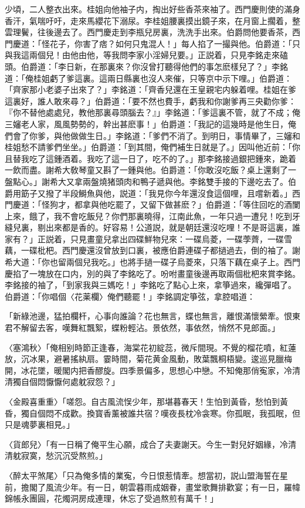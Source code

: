少頃，二人整衣出來。桂姐向他袖子内，掏出好些香茶來袖了。西門慶則使的滿身香汗，氣喘吁吁，走來馬纓花下溺尿。李桂姐腰裏摸出鏡子來，在月窗上擱着，整雲理鬢，往後邊去了。西門慶走到李瓶兒房裏，洗洗手出來。伯爵問他要香茶，西門慶道：「怪花子，你害了痞？如何只鬼混人！」每人掐了一撮與他。伯爵道：「只與我這兩個兒！由他由他，等我問李家小淫婦兒要。」正説着，只見李銘走來磕頭。伯爵道：「李日新，在那裏來？你沒曾打聽得他們的事怎麽樣兒了？」李銘道：「俺桂姐虧了爹這裏。這兩日縣裏也沒人來催，只等京中示下哩。」伯爵道：「齊家那小老婆子出來了？」李銘道：「齊香兒還在王皇親宅内躲着哩。桂姐在爹這裏好，誰人敢來尋？」伯爵道：「要不然也費手，虧我和你謝爹再三央勸你爹：『你不替他處處兒，教他那裏尋頭腦去？』」李銘道：「爹這裏不管，就了不成；俺三嬸老人家，風風勢勢的，幹出甚麽事！」伯爵道：「我記的這幾時是他生日，俺們會了你爹，與他做做生日。」李銘道：「爹們不消了。到明日，事情畢了，三嬸和桂姐愁不請爹們坐坐。」伯爵道：「到其間，俺們補生日就是了。」因叫他近前：「你且替我吃了這鍾酒着。我吃了這一日了，吃不的了。」那李銘接過銀把鍾來，跪着一飲而盡。謝希大敎琴童又斟了一鍾與他。伯爵道：「你敢沒吃飯？桌上還剩了一盤點心。」謝希大又拿兩盤燒猪頭肉和鴨子遞與他。李銘雙手接的下邊吃去了。伯爵用筯子又撥了半段鰣魚與他，説道：「我見你今年還沒食這個哩，且嚐新着。」西門慶道：「怪狗才，都拿與他吃罷了，又留下做甚麽？」伯爵道：「等住回吃的酒闌上來，餓了，我不會吃飯兒？你們那裏曉得，江南此魚，一年只過一遭兒！吃到牙縫兒裏，剔出來都是香的。好容易！公道説，就是朝廷還沒吃哩！不是哥這裏，誰家有？」正説着，只見畫童兒拿出四碟鮮物兒來：一碟烏菱，一碟荸薺，一碟雪藕，一碟枇杷。西門慶還沒曾放到口裏，被應伯爵連碟子都撾過去，倒的袖了。謝希大道：「你也留兩個兒我吃。」也將手撾一碟子烏菱來，只落下藕在桌子上。西門慶掐了一塊放在口内，別的與了李銘吃了。吩咐畫童後邊再取兩個枇杷來賞李銘。李銘接的袖了，「到家我與三媽吃！」李銘吃了點心上來，拿箏過來，纔彈唱了。伯爵道：「你唱個〈花薬欄〉俺們聽罷！」李銘調定箏弦，拿腔唱道：

\begin{myquote}
「新綠池邊，猛拍欄杆，心事向誰論？花也無言，蝶也無言，離恨滿懷縈牽。恨東君不解留去客，嘆舞紅飄絮，蝶粉輕沾。景依然，事依然，悄然不見郎面。」

{\markfont〈塞鴻秋〉}「俺相别時節正逢春，海棠花初綻蕊，微斥間現。不覺的榴花噴，紅蓮放，沉冰果，避暑搖紈扇。霎時間，菊花黄金風動，敗葉飄桐梧變。逡巡見臘梅開，冰花墜，暖閣内把香醪旋。四季景偏多，思想心中戀。不知俺那俏寃家，冷清清獨自個悶懨懨何處躭寂怨？」

{\markfont〈金殿喜重重〉}「嗟怨。自古風流悮少年，那堪暮春天！生怕到黃昏，愁怕到黃昏，獨自個悶不成歡。換寳香薰被誰共宿？嘆夜長枕冷衾寒。你孤眠，我孤眠，但只是魂夢裏相見。」

{\markfont〈貨郎兒〉}「有一日稱了俺平生心願，成合了夫妻謝天。今生一對兒好姻緣，冷清清躭寂寞，愁沉沉受熬煎。」

{\markfont〈醉太平煞尾〉}「只為俺多情的業寃，今日恨惹情牽。想當初，説山盟海誓在星前，擔閣了風流少年。有一日，朝雲暮雨成姻眷，畫堂歌舞排歡宴；有一日，羅幃錦帳永團圓，花燭洞房成連理，休忘了受過熬煎有萬千！」
\end{myquote}

